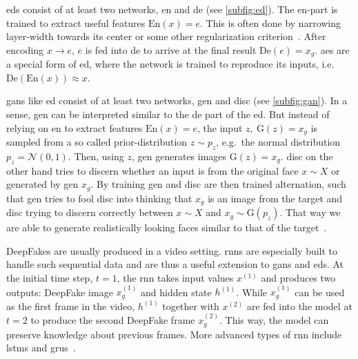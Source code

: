 \begin{description}[leftmargin=0cm]
    \item[\glspl{ed}] \glspl{ed} consist of at least two networks, \gls{en} and
    \gls{de} (see \cref{subfig:ed}). The \gls{en}-part is trained to extract
    useful features \(\text{En}(x)=e\). This is often done by narrowing
    layer-width towards its center or some other regularization criterion~\cite[cf.][499-505]{Goodfellow.2016}.
    After encoding \(x \rightarrow e\), \(e\) is fed into \gls{de} to arrive at
    the final result \(\text{De}(e)=x_g\). \Glspl{ae} are a special form of
    \gls{ed}, where the network is trained to reproduce its inputs, i.e.\
    \(\text{De}(\text{En}(x))\approx x\).

    \item[\glspl{gan}] \glspl{gan} like \gls{ed} consist of at least two networks,
    \gls{gen} and \gls{disc} (see \cref{subfig:gan}). In a sense, \gls{gen} can
    be interpreted similar to the \gls{de} part of the \gls{ed}. But instead of
    relying on \gls{en} to extract features \(\text{En}(x)=e\), the input
    \(z,\ \text{G}(z)=x_g\) is sampled from a so called prior-distribution
    \(z\sim p_z\), e.g.\ the normal distribution \(p_z=\mathcal{N}(0, 1)\). Then,
    using \(z\), \gls{gen} generates images \(\text{G}(z)=x_g\). \Gls{disc} on
    the other hand tries to discern whether an input is from the original face
    \(x\sim X\) or generated by \gls{gen} \(x_g\). By training \gls{gen} and
    \gls{disc} are then trained alternation, such that \gls{gen} tries to fool
    \gls{disc} into thinking that \(x_g\) is an image from the target and \gls{disc}
    trying to discern correctly between \(x\sim X\) and \(x_g\sim \text{G}(p_z)\).
    That way we are able to generate realistically looking faces similar to that
    of the target~\cite{Goodfellow.2014}.

    \item[\glspl{rnn}] DeepFakes are usually produced in a video setting.
    \Glspl{rnn} are especially built to handle such sequential data and are thus
    a useful extension to \glspl{gan} and \glspl{ed}. At the initial time step,
    \(t=1\), the \gls{rnn} takes input values \(x^{(1)}\) and produces two
    outputs: DeepFake image \(x_g^{(1)}\) and hidden state \(h^{(1)}\). While
    \(x_g^{(1)}\) can be used as the first frame in the video, \(h^{(1)}\) together
    with \(x^{(2)}\) are fed into the model at \(t=2\) to produce the second
    DeepFake frame \(x_g^{(2)}\). This way, the model can preserve knowledge
    about previous frames. More advanced types of \gls{rnn} include \glspl{lstm}
    and \glspl{gru}~\cite[\nopp 404\psqq]{Goodfellow.2016}.
\end{description}
